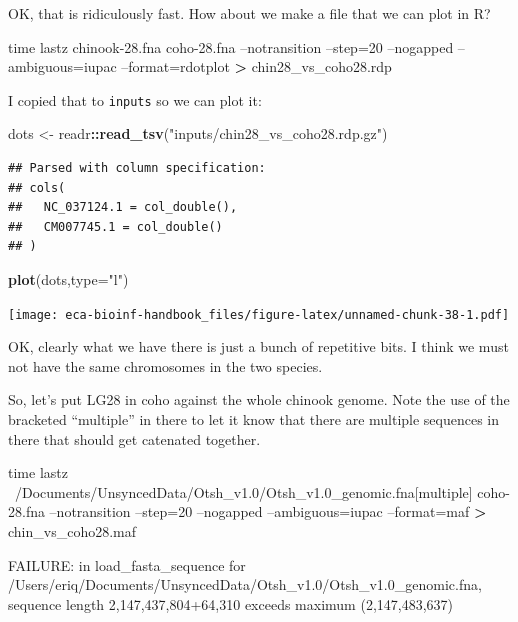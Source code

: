 \documentclass[]{krantz}
\makeatletter
\newenvironment{Shaded}{\begin{snugshade}}{\end{snugshade}}
\newcommand{\BuiltInTok}[1]{#1}
\newcommand{\DataTypeTok}[1]{\textcolor[rgb]{0.27,0.27,0.27}{#1}}
\newcommand{\ExtensionTok}[1]{#1}
\newcommand{\KeywordTok}[1]{\textcolor[rgb]{0.27,0.27,0.27}{\textbf{#1}}}
\newcommand{\NormalTok}[1]{#1}
\newcommand{\OperatorTok}[1]{\textcolor[rgb]{0.43,0.43,0.43}{\textbf{#1}}}
\newcommand{\StringTok}[1]{\textcolor[rgb]{0.5,0.5,0.5}{#1}}
\newenvironment{kframe}{%
\medskip{}
\setlength{\fboxsep}{.8em}
 \def\at@end@of@kframe{}%
 \ifinner\ifhmode%
  \def\at@end@of@kframe{\end{minipage}}%
  \begin{minipage}{\columnwidth}%
 \fi\fi%
 \def\FrameCommand##1{\hskip\@totalleftmargin \hskip-\fboxsep
 \colorbox{shadecolor}{##1}\hskip-\fboxsep
     \hskip-\linewidth \hskip-\@totalleftmargin \hskip\columnwidth}%
 \MakeFramed {\advance\hsize-\width
   \@totalleftmargin\z@ \linewidth\hsize
   \@setminipage}}%
 {\par\unskip\endMakeFramed%
 \at@end@of@kframe}
\renewenvironment{Shaded}{\begin{kframe}}{\end{kframe}}
\makeatother
\begin{document}
OK, that is ridiculously fast. How about we make a file that we can plot in R?

\begin{Shaded}
\begin{Highlighting}[]
\BuiltInTok{time}\NormalTok{ lastz chinook-28.fna coho-28.fna --notransition --step=20 --nogapped --ambiguous=iupac --format=rdotplot }\OperatorTok{>}\NormalTok{ chin28_vs_coho28.rdp}
\end{Highlighting}
\end{Shaded}

I copied that to \texttt{inputs} so we can plot it:

\begin{Shaded}
\begin{Highlighting}[]
\NormalTok{dots <-}\StringTok{ }\NormalTok{readr}\OperatorTok{::}\KeywordTok{read_tsv}\NormalTok{(}\StringTok{"inputs/chin28_vs_coho28.rdp.gz"}\NormalTok{)}
\end{Highlighting}
\end{Shaded}

\begin{verbatim}
## Parsed with column specification:
## cols(
##   NC_037124.1 = col_double(),
##   CM007745.1 = col_double()
## )
\end{verbatim}

\begin{Shaded}
\begin{Highlighting}[]
\KeywordTok{plot}\NormalTok{(dots,}\DataTypeTok{type=}\StringTok{"l"}\NormalTok{)}
\end{Highlighting}
\end{Shaded}

\texttt{[image: eca-bioinf-handbook\_files/figure-latex/unnamed-chunk-38-1.pdf]}

OK, clearly what we have there is just a bunch of repetitive bits. I think we must not have the same chromosomes in the two species.

So, let's put LG28 in coho against the whole chinook genome. Note the use of the
bracketed ``multiple'' in there to let it know that there are multiple sequences in there
that should get catenated together.

\begin{Shaded}
\begin{Highlighting}[]
\BuiltInTok{time}\NormalTok{ lastz ~/Documents/UnsyncedData/Otsh_v1.0/Otsh_v1.0_genomic.fna[multiple]  coho-28.fna --notransition --step=20 --nogapped --ambiguous=iupac --format=maf }\OperatorTok{>}\NormalTok{ chin_vs_coho28.maf}

\ExtensionTok{FAILURE}\NormalTok{: in load_fasta_sequence for /Users/eriq/Documents/UnsyncedData/Otsh_v1.0/Otsh_v1.0_genomic.fna, sequence length 2,147,437,804+64,310 exceeds maximum (2,147,483,637)}
\end{Highlighting}
\end{Shaded}
\end{document}
